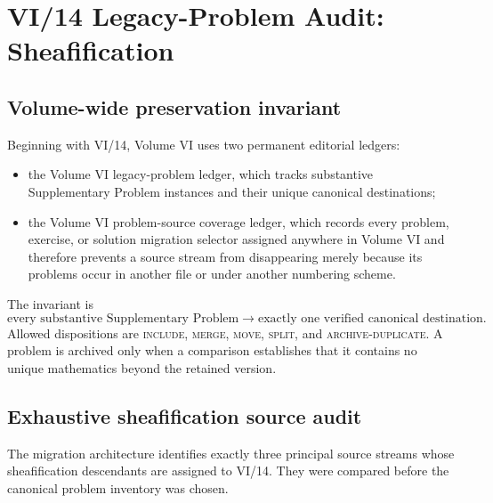 \chapter*{VI/14 Legacy-Problem Audit: Sheafification}

\section*{Volume-wide preservation invariant}
Beginning with VI/14, Volume VI uses two permanent editorial ledgers:
\begin{itemize}
\item the Volume VI legacy-problem ledger, which tracks substantive
Supplementary Problem instances and their unique canonical destinations;
\item the Volume VI problem-source coverage ledger, which records every
problem, exercise, or solution migration selector assigned anywhere in Volume VI and therefore
prevents a source stream from disappearing merely because its problems occur in another file
or under another numbering scheme.
\end{itemize}
The invariant is
\[
\boxed{\text{every substantive Supplementary Problem}\longrightarrow
\text{exactly one verified canonical destination}.}
\]
Allowed dispositions are \textsc{include}, \textsc{merge}, \textsc{move}, \textsc{split},
and \textsc{archive-duplicate}.  A problem is archived only when a comparison establishes
that it contains no unique mathematics beyond the retained version.

\section*{Exhaustive sheafification source audit}
The migration architecture identifies exactly three principal source streams whose
sheafification descendants are assigned to VI/14.  They were compared before the canonical
problem inventory was chosen.

